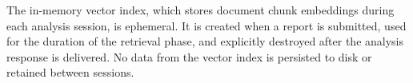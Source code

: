 The in-memory vector index, which stores document chunk embeddings during each analysis session, is ephemeral. It is created when a report is submitted, used for the duration of the retrieval phase, and explicitly destroyed after the analysis response is delivered. No data from the vector index is persisted to disk or retained between sessions.

